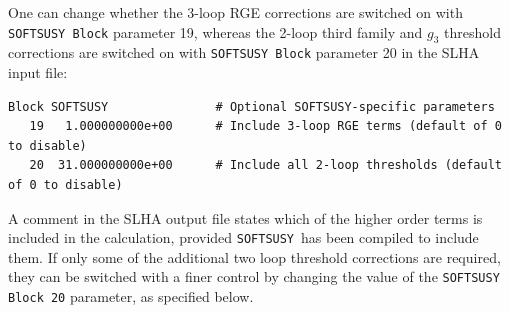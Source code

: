 \documentclass[final,3p,times,pdflatex]{elsarticle}
\def\code#1{{\tt #1}}
\begin{document}
One can change whether the 3-loop RGE corrections are switched on with
\code{SOFTSUSY Block} parameter 19, whereas the 2-loop third family and $g_3$
threshold corrections 
are switched on with \code{SOFTSUSY Block} parameter 20 in the SLHA input file:
\begin{verbatim}
Block SOFTSUSY               # Optional SOFTSUSY-specific parameters
   19   1.000000000e+00      # Include 3-loop RGE terms (default of 0 to disable)
   20  31.000000000e+00      # Include all 2-loop thresholds (default of 0 to disable)
\end{verbatim}
A comment in the SLHA output file states which of the higher order terms is
included in the calculation, provided {\tt SOFTSUSY}~has been compiled to
include them. If only some of the additional two loop threshold corrections
are required, they can be switched with a finer control by changing the value
of the {\tt SOFTSUSY Block 20} parameter, as specified below.
\end{document}
